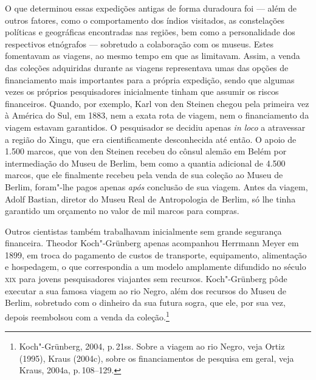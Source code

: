 O que determinou essas expedições antigas de forma duradoura foi --- além
de outros fatores, como o comportamento dos índios visitados, as
constelações políticas e geográficas encontradas nas regiões, bem como
a personalidade dos respectivos etnógrafos --- sobretudo a colaboração
com os museus. Estes fomentavam as viagens, ao mesmo tempo em que as
limitavam. Assim, a venda das coleções adquiridas durante as viagens
representava umas das opções de financiamento mais importantes para a
própria expedição, sendo que algumas vezes os próprios pesquisadores
inicialmente tinham que assumir os riscos financeiros. Quando, por
exemplo, Karl von den Steinen chegou pela primeira vez à América do Sul,
em 1883, nem a exata rota de viagem, nem o financiamento da viagem
estavam garantidos. O pesquisador se decidiu apenas \textit{in loco} a
atravessar a região do Xingu, que era cientificamente desconhecida até
então. O apoio de 1.500 marcos, que von den Steinen recebeu do cônsul
alemão em Belém por intermediação do Museu de Berlim, bem como a quantia
adicional de 4.500 marcos, que ele finalmente recebeu pela venda de sua
coleção ao Museu de Berlim, foram"-lhe pagos apenas \textit{após}
conclusão de sua viagem. Antes da viagem, Adolf Bastian,
diretor do Museu Real de Antropologia de Berlim, só lhe tinha garantido
um orçamento no valor de mil marcos para compras.

Outros cientistas também trabalhavam inicialmente sem grande segurança
financeira. Theodor Koch"-Grünberg apenas acompanhou Herrmann Meyer em
1899, em troca do pagamento de custos de transporte, equipamento,
alimentação e hospedagem, o que correspondia a um modelo amplamente
difundido no século \textsc{xix} para jovens pesquisadores viajantes sem
recursos. Koch"-Grünberg pôde executar a sua famosa viagem ao rio Negro,
além dos recursos do Museu de Berlim, sobretudo com o dinheiro da sua
futura sogra, que ele, por sua vez, depois reembolsou com a venda da
coleção.\footnote{Koch"-Grünberg, 2004, p.\,21ss. Sobre a viagem ao rio
  Negro, veja Ortiz (1995), Kraus (2004c), sobre os financiamentos de
  pesquisa em geral, veja Kraus, 2004a, p.\,108--129.}

